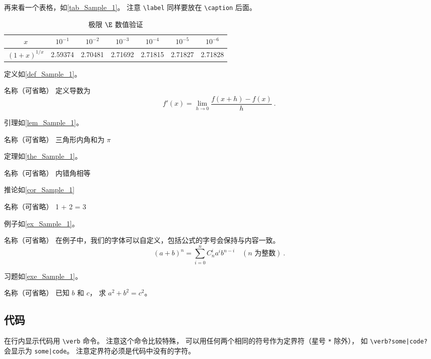 再来看一个表格，如\autoref{tab_Sample_1}。 注意 \verb|\label| 同样要放在 \verb|\caption| 后面。
\begin{table}[ht]
\centering
\caption{极限 $\E$ 数值验证}\label{tab_Sample_1}
\begin{tabular}{|c|c|c|c|c|c|c|}
\hline
$x$ & ${10^{ - 1}}$ & ${10^{ - 2}}$ & ${10^{ - 3}}$ & ${10^{ - 4}}$ & ${10^{ - 5}}$ & ${10^{ - 6}}$ \\
\hline
$(1 + x)^{1/x}$ & 2.59374 & 2.70481 & 2.71692 & 2.71815 & 2.71827 & 2.71828 \\
\hline
\end{tabular}
\end{table}

定义如\autoref{def_Sample_1}。
\begin{definition}{名称（可省略）}\label{def_Sample_1}
定义导数为
\begin{equation}
f'(x) = \lim_{h \to 0} \frac{f(x + h) - f(x)}{h}~.
\end{equation}
\end{definition}

引理如\autoref{lem_Sample_1}。
\begin{lemma}{名称（可省略）}\label{lem_Sample_1}
三角形内角和为 $\pi$
\end{lemma}

定理如\autoref{the_Sample_1}。
\begin{theorem}{名称（可省略）}\label{the_Sample_1}
内错角相等
\end{theorem}

推论如\autoref{cor_Sample_1}
\begin{corollary}{名称（可省略）}\label{cor_Sample_1}
1 + 2 = 3
\end{corollary}

例子如\autoref{ex_Sample_1}。 
\begin{example}{名称（可省略）}\label{ex_Sample_1}
在例子中，我们的字体可以自定义，包括公式的字号会保持与内容一致。
\begin{equation}
(a+b)^n = \sum_{i=0}^n C_n^i a^i b^{n-i} \quad (\text{$n$ 为整数})~.
\end{equation}
\end{example}

习题如\autoref{exe_Sample_1}。 
\begin{exercise}{名称（可省略）}\label{exe_Sample_1}
已知 $b$ 和 $c$， 求 $a^2 + b^2 = c^2$。
\end{exercise}

\subsection{代码}
在行内显示代码用 \verb|\verb| 命令。 注意这个命令比较特殊， 可以用任何两个相同的符号作为定界符（星号 \verb|*| 除外）， 如 \verb+\verb?some|code?+ 会显示为 \verb?some|code?。 注意定界符必须是代码中没有的字符。

